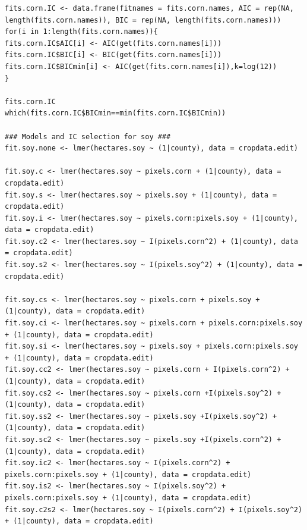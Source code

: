 \documentclass{article}
\begin{document}
\begin{Verbatim}[fontsize=\tiny]
fits.corn.IC <- data.frame(fitnames = fits.corn.names, AIC = rep(NA, length(fits.corn.names)), BIC = rep(NA, length(fits.corn.names)))
for(i in 1:length(fits.corn.names)){
fits.corn.IC$AIC[i] <- AIC(get(fits.corn.names[i]))
fits.corn.IC$BIC[i] <- BIC(get(fits.corn.names[i]))
fits.corn.IC$BICmin[i] <- AIC(get(fits.corn.names[i]),k=log(12))
}

fits.corn.IC
which(fits.corn.IC$BICmin==min(fits.corn.IC$BICmin))

### Models and IC selection for soy ###
fit.soy.none <- lmer(hectares.soy ~ (1|county), data = cropdata.edit)

fit.soy.c <- lmer(hectares.soy ~ pixels.corn + (1|county), data = cropdata.edit)
fit.soy.s <- lmer(hectares.soy ~ pixels.soy + (1|county), data = cropdata.edit)
fit.soy.i <- lmer(hectares.soy ~ pixels.corn:pixels.soy + (1|county), data = cropdata.edit)
fit.soy.c2 <- lmer(hectares.soy ~ I(pixels.corn^2) + (1|county), data = cropdata.edit)
fit.soy.s2 <- lmer(hectares.soy ~ I(pixels.soy^2) + (1|county), data = cropdata.edit)

fit.soy.cs <- lmer(hectares.soy ~ pixels.corn + pixels.soy + (1|county), data = cropdata.edit)
fit.soy.ci <- lmer(hectares.soy ~ pixels.corn + pixels.corn:pixels.soy + (1|county), data = cropdata.edit)
fit.soy.si <- lmer(hectares.soy ~ pixels.soy + pixels.corn:pixels.soy + (1|county), data = cropdata.edit)
fit.soy.cc2 <- lmer(hectares.soy ~ pixels.corn + I(pixels.corn^2) + (1|county), data = cropdata.edit)
fit.soy.cs2 <- lmer(hectares.soy ~ pixels.corn +I(pixels.soy^2) + (1|county), data = cropdata.edit)
fit.soy.ss2 <- lmer(hectares.soy ~ pixels.soy +I(pixels.soy^2) + (1|county), data = cropdata.edit)
fit.soy.sc2 <- lmer(hectares.soy ~ pixels.soy +I(pixels.corn^2) + (1|county), data = cropdata.edit)
fit.soy.ic2 <- lmer(hectares.soy ~ I(pixels.corn^2) + pixels.corn:pixels.soy + (1|county), data = cropdata.edit)
fit.soy.is2 <- lmer(hectares.soy ~ I(pixels.soy^2) + pixels.corn:pixels.soy + (1|county), data = cropdata.edit)
fit.soy.c2s2 <- lmer(hectares.soy ~ I(pixels.corn^2) + I(pixels.soy^2) + (1|county), data = cropdata.edit)


\end{Verbatim}
\end{document}
